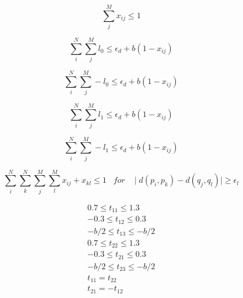         \begin{equation}
            \label{eq:subject_sum_columns}
            \sum_{j}^{M} x_{ij} \leq 1
        \end{equation}

        \begin{equation}
            \label{eq:subject_transformation_0}
            \sum_{i}^{N} \sum_{j}^{M} l_{0} \leq \epsilon_d + b (1 - x_{ij})
        \end{equation}

        \begin{equation}
            \label{eq:subject_transformation_negative_0}
            \sum_{i}^{N} \sum_{j}^{M} -l_{0} \leq \epsilon_d + b (1 - x_{ij})
        \end{equation}

        \begin{equation}
            \label{eq:subject_transformation_1}
            \sum_{i}^{N} \sum_{j}^{M} l_{1} \leq \epsilon_d + b (1 - x_{ij})
        \end{equation}

        \begin{equation}
            \label{eq:subject_transformation_negative_1}
            \sum_{i}^{N} \sum_{j}^{M} -l_{1} \leq \epsilon_d + b (1 - x_{ij})
        \end{equation}

        \begin{equation}
            \label{eq:subject_lines_preservation}
            \sum_{i}^{N} \sum_{k}^{N} \sum_{j}^{M} \sum_{l}^{M} x_{ij} + x_{kl} \leq 1 \;\;\; for \;\;\; \mid d(p_i, p_k) - d(q_j, q_l) \mid \geq \epsilon_l
        \end{equation}

        \begin{equation}
            \label{eq:subject_transformation_variables}
            \begin{gathered}
                0.7 \leq t_{11} \leq 1.3 \\
                -0.3 \leq t_{12} \leq 0.3 \\
                - b / 2 \leq t_{13} \leq - b / 2 \\
                0.7 \leq t_{22} \leq 1.3 \\
                -0.3 \leq t_{21} \leq 0.3 \\
                - b / 2 \leq t_{23} \leq - b / 2 \\
                t_{11} = t_{22} \\
                t_{21} = -t_{12}
            \end{gathered}
        \end{equation}
        

